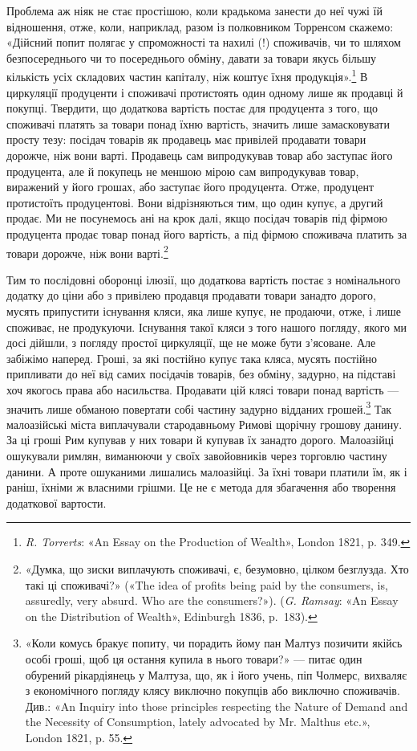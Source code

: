 Проблема аж ніяк не стає простішою, коли крадькома занести
до неї чужі їй відношення, отже, коли, наприклад, разом із полковником
Торренсом скажемо: «Дійсний попит полягає у спроможності
та нахилі (!) споживачів, чи то шляхом безпосереднього
чи то посереднього обміну, давати за товари якусь більшу
кількість усіх складових частин капіталу, ніж коштує їхня продукція».\footnote{
\emph{R. Torrerts}: «An Essay on the Production of Wealth», London
1821, p. 349.
}
В циркуляції продуценти і споживачі протистоять
один одному лише як продавці й покупці. Твердити, що додаткова
вартість постає для продуцента з того, що споживачі платять
за товари понад їхню вартість, значить лише замасковувати
просту тезу: посідач товарів як продавець має привілей продавати
товари дорожче, ніж вони варті. Продавець сам випродукував
товар або заступає його продуцента, але й покупець не меншою
мірою сам випродукував товар, виражений у його грошах,
або заступає його продуцента. Отже, продуцент протистоїть
продуцентові. Вони відрізняються тим, що один купує, а другий
продає. Ми не посунемось ані на крок далі, якщо посідач товарів
під фірмою продуцента продає товар понад його вартість, а під
фірмою споживача платить за товари дорожче, ніж вони варті.\footnote{
«Думка, що зиски виплачують споживачі, є, безумовно, цілком
безглузда. Хто такі ці споживачі?» («The idea of profits being paid by
the consumers, is, assuredly, very absurd. Who are the consumers?»).
(\emph{G. Ramsay}: «An Essay on the Distribution of Wealth», Edinburgh 1836, p.~183).
}

Тим то послідовні оборонці ілюзії, що додаткова вартість
постає з номінального додатку до ціни або з привілею продавця
продавати товари занадто дорого, мусять припустити існування
кляси, яка лише купує, не продаючи, отже, і лише споживає,
не продукуючи. Існування такої кляси з того нашого погляду,
якого ми досі дійшли, з погляду простої циркуляції, ще не може
бути з’ясоване. Але забіжімо наперед. Гроші, за які постійно
купує така кляса, мусять постійно припливати до неї від самих
посідачів товарів, без обміну, задурно, на підставі хоч якогось
права або насильства. Продавати цій клясі товари понад вартість
— значить лише обманою повертати собі частину задурно
відданих грошей.\footnote{
«Коли комусь бракує попиту, чи порадить йому пан Малтуз позичити
якійсь особі гроші, щоб ця остання купила в нього товари?» — питає
один обурений рікардіянець у Малтуза, що, як і його учень, піп Чолмерс,
вихваляє з економічного погляду клясу виключно покупців або виключно
споживачів. Див.: «An Inquiry into those principles respecting the Nature
of Demand and the Necessity of Consumption, lately advocated by Mr. Malthus
etc.», London 1821, p. 55.
} Так малоазійські міста виплачували стародавньому
Римові щорічну грошову данину. За ці гроші Рим купував
у них товари й купував їх занадто дорого. Малоазійці ошукували
римлян, виманюючи у своїх завойовників через торговлю
частину данини. А проте ошуканими лишались малоазійці. За
їхні товари платили їм, як і раніш, їхніми ж власними грішми.
Це не є метода для збагачення або творення додаткової вартости.

